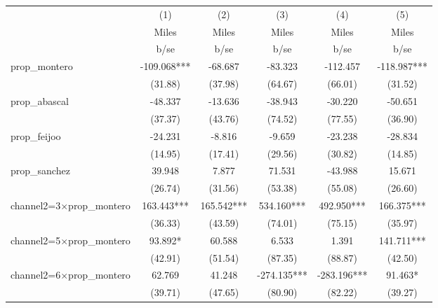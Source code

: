 \begin{tabular}{l*{5}{c}}
\toprule
                    &\multicolumn{1}{c}{(1)}&\multicolumn{1}{c}{(2)}&\multicolumn{1}{c}{(3)}&\multicolumn{1}{c}{(4)}&\multicolumn{1}{c}{(5)}\\
                    &\multicolumn{1}{c}{Miles}&\multicolumn{1}{c}{Miles}&\multicolumn{1}{c}{Miles}&\multicolumn{1}{c}{Miles}&\multicolumn{1}{c}{Miles}\\
                    &        b/se   &        b/se   &        b/se   &        b/se   &        b/se   \\
\midrule
prop\_montero        &    -109.068***&     -68.687   &     -83.323   &    -112.457   &    -118.987***\\
                    &     (31.88)   &     (37.98)   &     (64.67)   &     (66.01)   &     (31.52)   \\
prop\_abascal        &     -48.337   &     -13.636   &     -38.943   &     -30.220   &     -50.651   \\
                    &     (37.37)   &     (43.76)   &     (74.52)   &     (77.55)   &     (36.90)   \\
prop\_feijoo         &     -24.231   &      -8.816   &      -9.659   &     -23.238   &     -28.834   \\
                    &     (14.95)   &     (17.41)   &     (29.56)   &     (30.82)   &     (14.85)   \\
prop\_sanchez        &      39.948   &       7.877   &      71.531   &     -43.988   &      15.671   \\
                    &     (26.74)   &     (31.56)   &     (53.38)   &     (55.08)   &     (26.60)   \\
channel2=3$\times$prop\_montero&     163.443***&     165.542***&     534.160***&     492.950***&     166.375***\\
                    &     (36.33)   &     (43.59)   &     (74.01)   &     (75.15)   &     (35.97)   \\
channel2=5$\times$prop\_montero&      93.892*  &      60.588   &       6.533   &       1.391   &     141.711***\\
                    &     (42.91)   &     (51.54)   &     (87.35)   &     (88.87)   &     (42.50)   \\
channel2=6$\times$prop\_montero&      62.769   &      41.248   &    -274.135***&    -283.196***&      91.463*  \\
                    &     (39.71)   &     (47.65)   &     (80.90)   &     (82.22)   &     (39.27)   \\

\end{tabular}
